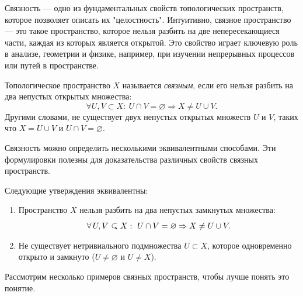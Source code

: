 


Связность — одно из фундаментальных свойств топологических пространств, которое позволяет описать их "целостность". Интуитивно, связное пространство — это такое пространство, которое нельзя разбить на две непересекающиеся части, каждая из которых является открытой. Это свойство играет ключевую роль в анализе, геометрии и физике, например, при изучении непрерывных процессов или путей в пространстве.

\begin{definition}[Связность]
Топологическое пространство $ X $ называется \textit{связным}, если его нельзя разбить на два непустых открытых множества:
\[
\forall U, V \subset X: \ U \cap V = \varnothing \Rightarrow X \neq U \cup V.
\]
Другими словами, не существует двух непустых открытых множеств $ U $ и $ V $, таких что $ X = U \cup V $ и $ U \cap V = \varnothing $.
\end{definition}

Связность можно определить несколькими эквивалентными способами. Эти формулировки полезны для доказательства различных свойств связных пространств.

\begin{statement}
Следующие утверждения эквивалентны:
\begin{enumerate}
    \item Пространство $ X $ нельзя разбить на два непустых замкнутых множества:
    \[
    \forall U, V \closed X: \ U \cap V = \varnothing \Rightarrow X \neq U \cup V.
    \]
    \item Не существует нетривиального подмножества $ U \subset X $, которое одновременно открыто и замкнуто ($ U \neq \varnothing $ и $ U \neq X $).
\end{enumerate}
\end{statement}


Рассмотрим несколько примеров связных пространств, чтобы лучше понять это понятие.

